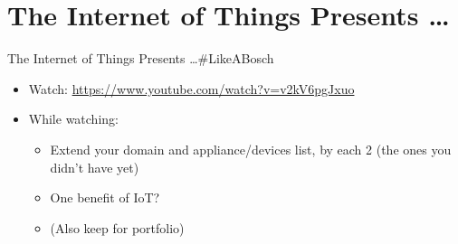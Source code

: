 ﻿\section{The Internet of Things Presents \ldots}

\begin{frame}{The Internet of Things Presents \ldots \#LikeABosch}
\begin{itemize}
    \item Watch: \href{https://www.youtube.com/watch?v=v2kV6pgJxuo}{\alert{https://www.youtube.com/watch?v=v2kV6pgJxuo}}
\item While watching:
\begin{itemize}
    \item \alert{Extend your domain and appliance/devices list}, by each 2 (the ones you didn’t have yet)
    \item One \alert{benefit} of IoT?
    \item (Also keep for portfolio)
\end{itemize}
\end{itemize}
\end{frame}
